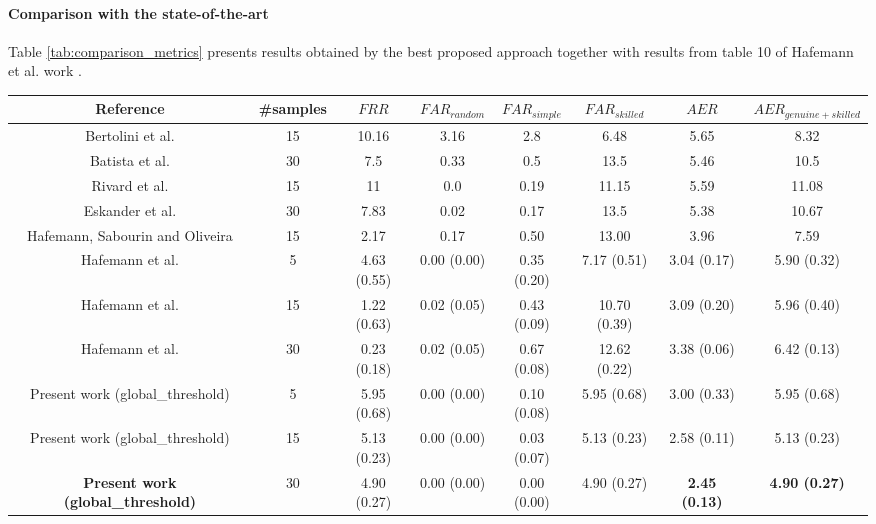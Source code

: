\documentclass[conference]{IEEEtran}
\begin{document}
\paragraph{Comparison with the state-of-the-art}
Table \ref{tab:comparison_metrics} presents results obtained by the best proposed approach together with results from table 10 of Hafemann et al. work \cite{hafemann:17}. 


\begin{table*}[!htb]
\caption{Comparison with the state-of-the-art on the Brazilian PUC-PR dataset, using Max function (errors in \%).}
\label{tab:comparison_metrics}
\scriptsize
\centering


\begin{tabular}{cccccccc}
\hline
Reference & \#samples & $FRR$  &  $FAR_{random}$ & $FAR_{simple}$  & $FAR_{skilled}$  &  $AER$  &  $AER_{genuine+skilled}$ \\ 
\hline
Bertolini et al. \cite{bertolini:10} & 15 &  10.16  &  3.16 & 2.8  & 6.48  &  5.65 &  8.32 \\ 
Batista et al. \cite{batista:12} & 30 &  7.5  &  0.33 & 0.5  & 13.5  &  5.46 &  10.5 \\ 
Rivard et al. \cite{rivard:13} & 15  &  11  &  0.0 & 0.19  & 11.15  &  5.59 &  11.08 \\ 
Eskander et al. \cite{eskander:13} & 30 &  7.83  &  0.02 & 0.17  & 13.5  &  5.38 &  10.67 \\ 
Hafemann, Sabourin and Oliveira \cite{hafemann:16} & 15  &  2.17  &  0.17 & 0.50 & 13.00 &  3.96 & 7.59 \\ 
Hafemann et al. \cite{hafemann:17} & 5  &  4.63 (0.55)  &  0.00 (0.00) & 0.35 (0.20)  & 7.17 (0.51)  &  3.04 (0.17) &  5.90 (0.32) \\ 
Hafemann et al. \cite{hafemann:17} & 15  &  1.22 (0.63)  &  0.02 (0.05) & 0.43 (0.09) & 10.70 (0.39)  &  3.09 (0.20) &  5.96 (0.40) \\ 
Hafemann et al. \cite{hafemann:17} & 30  &  0.23 (0.18)  &  0.02 (0.05) & 0.67 (0.08)  & 12.62 (0.22)  &  3.38 (0.06) &  6.42 (0.13) \\ 
Present work (global\_threshold)  & 5 & 5.95 (0.68) & 0.00 (0.00)  & 0.10 (0.08)  & 5.95 (0.68)  &  3.00 (0.33) &  5.95 (0.68) \\ 
Present work (global\_threshold)  & 15 & 5.13 (0.23) & 0.00 (0.00)  & 0.03 (0.07)  & 5.13 (0.23)  & 2.58 (0.11)  & 5.13 (0.23)  \\ 
\textbf{Present work (global\_threshold)}  & 30 & 4.90 (0.27)  &  0.00 (0.00) & 0.00 (0.00)  & 4.90 (0.27)  &  \textbf{2.45 (0.13)} &  \textbf{4.90 (0.27)} \\ 
\hline


\end{tabular}
\end{table*}
\end{document}

